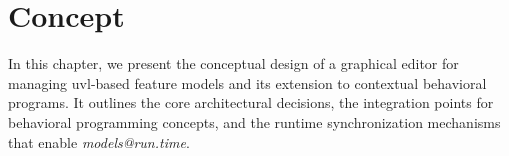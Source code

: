 \chapter{Concept}
\label{chapter:concept}

In this chapter, we present the conceptual design of a graphical editor for managing \gls{uvl}-based feature models and its extension to contextual behavioral programs.
It outlines the core architectural decisions, the integration points for behavioral programming concepts, and the runtime synchronization mechanisms that enable \textit{models@run.time}.








